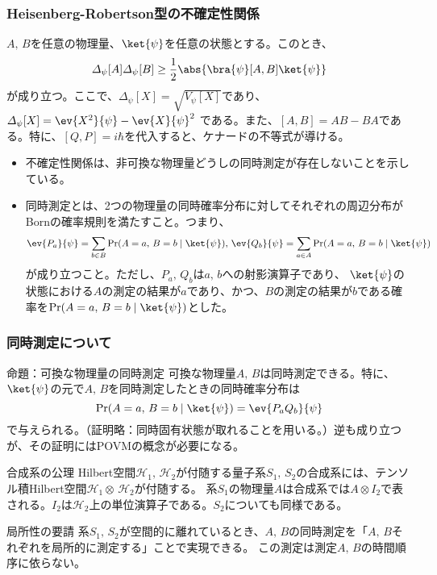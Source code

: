 \documentclass[10pt,aspectratio=169,xcolor=dvipsnames,table,dvipdfmx]{beamer}
\begin{document}
\begin{frame}
  \frametitle{Heisenberg-Robertson型の不確定性関係}
$A,\,B$を任意の物理量、$\ket{\psi}$を任意の状態とする。このとき、
\begin{equation}
  \varDelta_{\psi}[A]\varDelta_{\psi}[B]\geq \frac{1}{2}\abs{\bra{\psi}[A,B]\ket{\psi}}
\end{equation}
が成り立つ。ここで、$\varDelta_{\psi}[X] = \sqrt{V_{\psi}[X]}$であり、
$\varDelta_{\psi}[X] = \ev{X^2}{\psi} - \ev{X}{\psi}^2$
である。また、$[A,B] = AB-BA$である。特に、$[Q,P]=i\hbar$を代入すると、ケナードの不等式が導ける。

\begin{itemize}
  \item 不確定性関係は、非可換な物理量どうしの同時測定が存在しないことを示している。
  \item 同時測定とは、2つの物理量の同時確率分布に対してそれぞれの周辺分布がBornの確率規則を満たすこと。つまり、
  \begin{equation}
    \ev{P_a}{\psi} = \sum_{b\in B}\Pr(A=a,\,B=b\mid\ket{\psi}),\, \ev{Q_b}{\psi} = \sum_{a\in A}\Pr(A=a,\,B=b\mid\ket{\psi})
  \end{equation}
  が成り立つこと。ただし、$P_a,\,Q_b$は$a,\,b$への射影演算子であり、
  $\ket{\psi}$の状態における$A$の測定の結果が$a$であり、かつ、$B$の測定の結果が$b$である確率を$\Pr(A=a,\,B=b\mid\ket{\psi})$とした。
\end{itemize}
\end{frame}

\begin{frame}
  \frametitle{同時測定について}
  \begin{block}{命題：可換な物理量の同時測定}
    可換な物理量$A,\,B$は同時測定できる。特に、$\ket{\psi}$の元で$A,\,B$を同時測定したときの同時確率分布は
  \begin{equation}
    \Pr(A=a,\,B=b\mid\ket{\psi}) = \ev{P_aQ_b}{\psi}
  \end{equation}
  で与えられる。（証明略：同時固有状態が取れることを用いる。）逆も成り立つが、その証明にはPOVMの概念が必要になる。
  \end{block}
  \begin{block}{合成系の公理}
    Hilbert空間$\mathcal{H}_1,\,\mathcal{H}_2$が付随する量子系$S_1,\,S_2$の合成系には、テンソル積Hilbert空間$\mathcal{H}_1\otimes\,\mathcal{H}_2$が付随する。
    系$S_1$の物理量$A$は合成系では$A\otimes I_2$で表される。$I_2$は$\mathcal{H}_2$上の単位演算子である。$S_2$についても同様である。
  \end{block}
  \begin{block}{局所性の要請}
    系$S_1,\,S_2$が空間的に離れているとき、$A,\,B$の同時測定を「$A,\,B$それぞれを局所的に測定する」ことで実現できる。
    この測定は測定$A,\,B$の時間順序に依らない。
  \end{block}
  

\end{frame}
\end{document}
